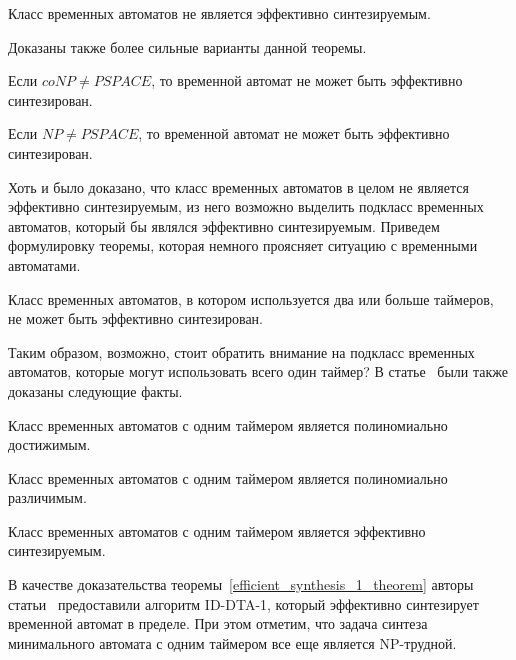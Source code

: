 \documentclass[times,specification,annotation]{itmo-student-thesis}
\begin{document}
\begin{theorem}
  Класс временных автоматов не является эффективно синтезируемым.
  \label{efficient_synthesis_theorem}
\end{theorem}

Доказаны также более сильные варианты данной теоремы.

\begin{theorem}
  Если $coNP \neq PSPACE$, то временной автомат не может быть эффективно синтезирован.
  \label{coNPneqPSPACE_lemma}
\end{theorem}

\begin{theorem}
  Если $NP \neq PSPACE$, то временной автомат не может быть эффективно синтезирован.
  \label{NPneqPSPACE_lemma}
\end{theorem}

Хоть и было доказано, что класс временных автоматов в целом не является эффективно синтезируемым, из него возможно выделить подкласс временных автоматов, 
который бы являлся эффективно синтезируемым. Приведем формулировку теоремы, которая немного проясняет ситуацию с временными автоматами.

\begin{theorem}
  Класс временных автоматов, в котором используется два или больше таймеров, не может быть эффективно синтезирован.
  \label{two_or_more_timers_lemma}
\end{theorem}

Таким образом, возможно, стоит обратить внимание на подкласс временных автоматов, которые могут использовать всего один таймер? 
В статье~\cite{1-dta} были также доказаны следующие факты.

\begin{lemma}
  Класс временных автоматов с одним таймером является полиномиально достижимым.
  \label{reachability_1_lemma}
\end{lemma}

\begin{lemma}
  Класс временных автоматов с одним таймером является полиномиально различимым.
  \label{distinguishability_1_lemma}
\end{lemma}

\begin{theorem}
  Класс временных автоматов с одним таймером является эффективно синтезируемым.
  \label{efficient_synthesis_1_theorem}
\end{theorem}

В качестве доказательства теоремы~\ref{efficient_synthesis_1_theorem} авторы статьи~\cite{1-dta} предоставили алгоритм ID-DTA-1, который эффективно синтезирует временной автомат в пределе.
При этом отметим, что задача синтеза минимального автомата с одним таймером все еще является NP-трудной.
\end{document}
